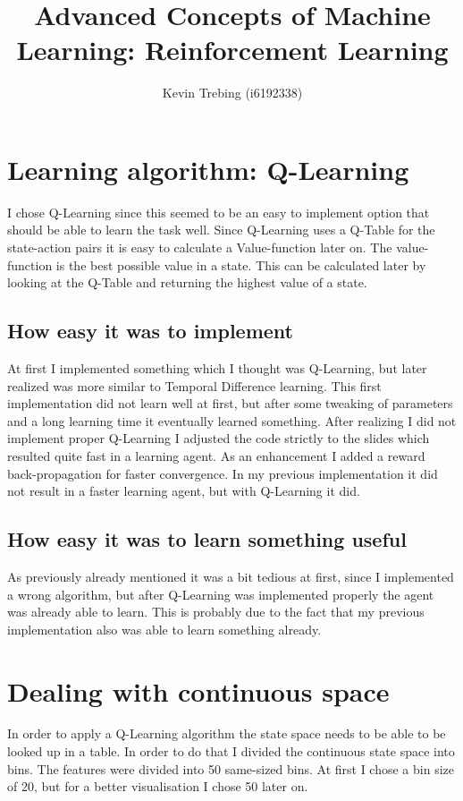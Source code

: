 \documentclass[a4paper]{article}
\title{Advanced Concepts of Machine Learning: Reinforcement Learning}
\author{Kevin Trebing (i6192338)}
\begin{document}
\maketitle

\section{Learning algorithm: Q-Learning}
I chose Q-Learning since this seemed to be an easy to implement option that should be able to learn the task well. Since Q-Learning uses a Q-Table for the state-action pairs it is easy to calculate a Value-function later on. The value-function is the best possible value in a state. This can be calculated later by looking at the Q-Table and returning the highest value of a state.

\subsection{How easy it was to implement}
At first I implemented something which I thought was Q-Learning, but later realized was more similar to Temporal Difference learning. This first implementation did not learn well at first, but after some tweaking of parameters and a long learning time it eventually learned something. After realizing I did not implement proper Q-Learning I adjusted the code strictly to the slides which resulted quite fast in a learning agent.
As an enhancement I added a reward back-propagation for faster convergence. In my previous implementation it did not result in a faster learning agent, but with Q-Learning it did.

\subsection{How easy it was to learn something useful}
As previously already mentioned it was a bit tedious at first, since I implemented a wrong algorithm, but after Q-Learning was implemented properly the agent was already able to learn. This is probably due to the fact that my previous implementation also was able to learn something already.

\section{Dealing with continuous space}
In order to apply a Q-Learning algorithm the state space needs to be able to be looked up in a table. In order to do that I divided the continuous state space into bins. The features were divided into 50 same-sized bins. At first I chose a bin size of 20, but for a better visualisation I chose 50 later on.
\end{document}
